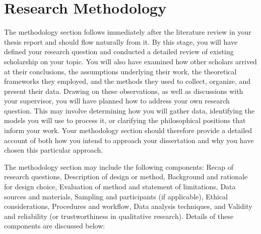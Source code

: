 %

\chapter{Research Methodology}
\label{ch:methodology}

The methodology section follows immediately after the literature review in your thesis report and should flow naturally from it. By this stage, you will have defined your research question and conducted a detailed review of existing scholarship on your topic. You will also have examined how other scholars arrived at their conclusions, the assumptions underlying their work, the theoretical frameworks they employed, and the methods they used to collect, organize, and present their data. Drawing on these observations, as well as discussions with your supervisor, you will have planned how to address your own research question. This may involve determining how you will gather data, identifying the models you will use to process it, or clarifying the philosophical positions that inform your work. Your methodology section should therefore provide a detailed account of both how you intend to approach your dissertation and why you have chosen this particular approach.

The methodology section may include the following components: Recap of research questions, Description of design or method, Background and rationale for design choice, Evaluation of method and statement of limitations, Data sources and materials, Sampling and participants (if applicable), Ethical considerations, Procedures and workflow, Data analysis techniques, and Validity and reliability (or trustworthiness in qualitative research). Details of these components are discussed below:

